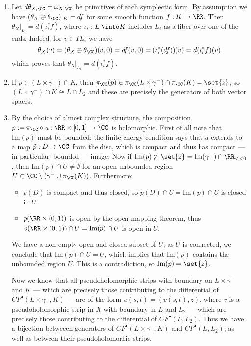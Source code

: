 
 
\begin{enumerate}
    \item Let $d\theta_{X,\CC}=\omega_{X,\CC}$ be primitives of each symplectic form. By assumption we have $(\theta_{X}\oplus\theta_\CC) |_{K}=df$ for some smooth function $f:K\to \RR$.  Then $\theta_X|_{L_i}=d(\iota_{i}^*f)$, where $\iota_{i}:L_i\into K$ includes $L_i$ as a fiber over one of the ends. Indeed, for $v\in TL_i$ we have
    \[
    \theta_X (v)=(\theta_X\oplus\theta_{\CC})(v,0)=df(v,0)=(\iota_i^*(df))(v)=d(\iota_i^* f)(v)
    \]
    which proves that $\theta_X|_{L_i}=d(\iota_i^*f)$. 
    
    \item If $p\in (L\times\gamma^-)\cap K$, then $\pi_\CC(p)\in \pi_\CC(L\times\gamma^-)\cap \pi_\CC(K)=\set{z}$, so $(L\times\gamma^-)\cap K \cong L\cap L_2$ and these are precisely the generators of both vector spaces.
    
    \item By the choice of almost complex structure, the composition $p:=\pi_\CC\circ u:\RR\times[0,1]\to\CC$ is holomorphic. First of all note that $\text{Im}(p)$ must be bounded: the finite energy condition says that $u$ extends to a map $\tilde p:D\to \CC$ from the disc, which is compact and thus has compact --- in particular, bounded --- image. Now if $\text{Im}(p)\not\subset\set{z}=\text{Im}(\gamma^-)\cap \RR_{<<0}$, then $\text{Im}(p)\cap U\neq\emptyset$ for an open unbounded region $U\subset \CC\setminus(\gamma^-\cup \pi_\CC(K))$. Furthermore:
    \begin{itemize}
        \item $\tilde p(D)$ is compact and thus closed, so $\tilde p(D)\cap U=\text{Im}(p)\cap U$ is closed in $U$.
        \item $p(\RR\times(0,1))$ is open by the open mapping theorem, thus $p(\RR\times(0,1))\cap U=\text{Im}(p)\cap U$ is open in $U$. 
    \end{itemize}
    We have a non-empty open and closed subset of $U$; as $U$ is connected, we conclude that $\text{Im}(p)\cap U=U$, which implies that $\text{Im}(p)$ contains the unbounded region $U$. This is a contradiction, so $\text{Im}(p)=\set{z}$.
    
    Now we know that all pseudoholomorphic strips with boundary on $L\times\gamma^-$ and $K$ --- which are precisely those contributing to the differential of $CF^\bullet(L\times\gamma^-,K)$ --- are of the form $u(s,t)=(v(s,t),z)$, where $v$ is a pseudoholomorphic strip in $X$ with boundary in $L$ and $L_2$ --- which are precisely those contributing to the differential of $CF^\bullet(L,L_2)$. Thus we have a bijection betweeen generators of $CF^\bullet(L\times \gamma^-,K)$ and $CF^\bullet(L,L_2)$, as well as between their pseudoholomorhic strips. 
    

\end{enumerate}
